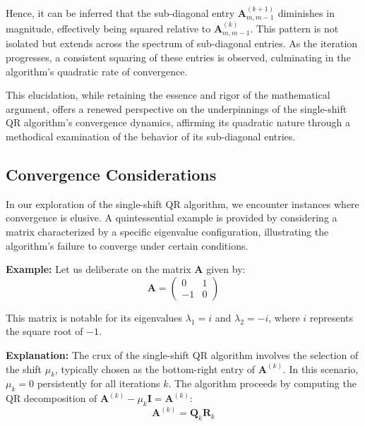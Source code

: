 \documentclass{article}
\begin{document}
Hence, it can be inferred that the sub-diagonal entry $\boldsymbol{A}_{m, m-1}^{(k+1)}$ diminishes in magnitude, effectively being squared relative to $\boldsymbol{A}_{m, m-1}^{(k)}$. This pattern is not isolated but extends across the spectrum of sub-diagonal entries. As the iteration progresses, a consistent squaring of these entries is observed, culminating in the algorithm's quadratic rate of convergence.

This elucidation, while retaining the essence and rigor of the mathematical argument, offers a renewed perspective on the underpinnings of the single-shift QR algorithm's convergence dynamics, affirming its quadratic nature through a methodical examination of the behavior of its sub-diagonal entries.


\subsection{Convergence Considerations}
In our exploration of the single-shift QR algorithm, we encounter instances where convergence is elusive. A quintessential example is provided by considering a matrix characterized by a specific eigenvalue configuration, illustrating the algorithm's failure to converge under certain conditions.

\textbf{Example:} Let us deliberate on the matrix $\boldsymbol{A}$ given by:
\begin{equation}
\boldsymbol{A} = \left(\begin{array}{cc}
0 & 1 \\
-1 & 0
\end{array}\right)
\end{equation}

This matrix is notable for its eigenvalues $\lambda_1 = i$ and $\lambda_2 = -i$, where $i$ represents the square root of $-1$. 

\textbf{Explanation:} The crux of the single-shift QR algorithm involves the selection of the shift $\mu_k$, typically chosen as the bottom-right entry of $\boldsymbol{A}^{(k)}$. In this scenario, $\mu_k = 0$ persistently for all iterations $k$. The algorithm proceeds by computing the QR decomposition of $\boldsymbol{A}^{(k)} - \mu_k \mathbf{I} = \boldsymbol{A}^{(k)}$:
\begin{equation}
\boldsymbol{A}^{(k)} = \boldsymbol{Q}_k \boldsymbol{R}_k
\end{equation}
\end{document}
